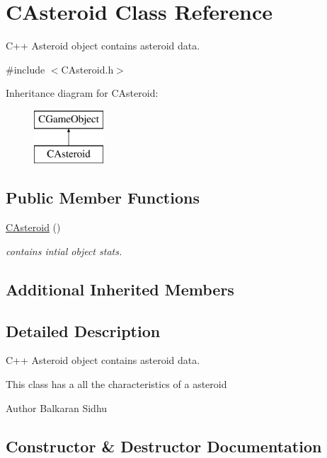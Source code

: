 \hypertarget{class_c_asteroid}{}\section{C\+Asteroid Class Reference}
\label{class_c_asteroid}


C++ Asteroid object contains asteroid data.  




{\ttfamily \#include $<$C\+Asteroid.\+h$>$}

Inheritance diagram for C\+Asteroid\+:\begin{figure}[H]
\begin{center}
\leavevmode
\includegraphics[height=2.000000cm]{class_c_asteroid}
\end{center}
\end{figure}
\subsection*{Public Member Functions}
\begin{DoxyCompactItemize}
\item 
\hyperlink{class_c_asteroid_a12e176ee14187759aab8c3c22b31803b}{C\+Asteroid} ()
\begin{DoxyCompactList}\small\item\em contains intial object stats. \end{DoxyCompactList}\end{DoxyCompactItemize}
\subsection*{Additional Inherited Members}


\subsection{Detailed Description}
C++ Asteroid object contains asteroid data. 

This class has a all the characteristics of a asteroid

\begin{DoxyAuthor}{Author}
Balkaran Sidhu 
\end{DoxyAuthor}


\subsection{Constructor \& Destructor Documentation}
\hypertarget{class_c_asteroid_a12e176ee14187759aab8c3c22b31803b}{}\label{class_c_asteroid_a12e176ee14187759aab8c3c22b31803b} 
